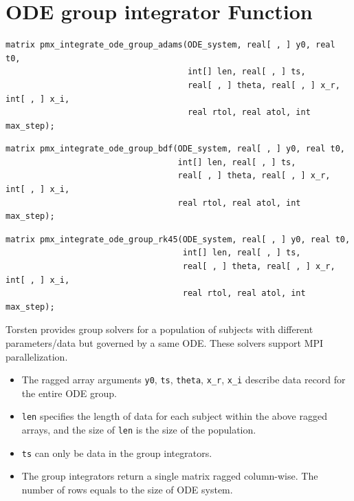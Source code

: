 \documentclass[11pt, reqno, oneside]{amsbook}
\numberwithin{equation}{chapter}
\numberwithin{figure}{chapter}
\numberwithin{table}{chapter}
\theoremstyle{remark}
\begin{document}
\section{ODE group  integrator Function}
\label{sec:orgfaff22c}
\begin{verbatim}
matrix pmx_integrate_ode_group_adams(ODE_system, real[ , ] y0, real t0,
                                     int[] len, real[ , ] ts,
                                     real[ , ] theta, real[ , ] x_r, int[ , ] x_i,
                                     real rtol, real atol, int max_step);
\end{verbatim}
\begin{verbatim}
matrix pmx_integrate_ode_group_bdf(ODE_system, real[ , ] y0, real t0,
                                   int[] len, real[ , ] ts,
                                   real[ , ] theta, real[ , ] x_r, int[ , ] x_i,
                                   real rtol, real atol, int max_step);
\end{verbatim}
\begin{verbatim}
matrix pmx_integrate_ode_group_rk45(ODE_system, real[ , ] y0, real t0,
                                    int[] len, real[ , ] ts,
                                    real[ , ] theta, real[ , ] x_r, int[ , ] x_i,
                                    real rtol, real atol, int max_step);
\end{verbatim}
Torsten provides group solvers for a population of subjects with different parameters/data but
governed by a same ODE. These solvers support MPI parallelization.
\begin{itemize}
\item The ragged array arguments \texttt{y0}, \texttt{ts}, \texttt{theta}, \texttt{x\_r}, \texttt{x\_i} describe data record for the
entire ODE group.
\item \texttt{len} specifies the length of data for each subject within
the above ragged arrays, and the size of \texttt{len} is the size
of the population.
\item \texttt{ts} can only be data in the group integrators.
\item The group integrators return a single matrix ragged
column-wise. The number of rows equals to the size of ODE system.
\end{itemize}
\end{document}
